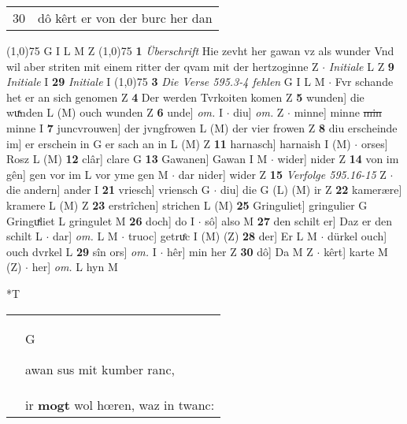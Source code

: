\documentclass[8pt,a4paper,notitlepage]{article}
\begin{document}
\begin{table}[ht]
\begin{minipage}[t]{0.5\linewidth}
\begin{tabular}{rl}
30 & dô kêrt er von der burc her dan\\ 
\end{tabular}
\scriptsize
\line(1,0){75} \newline
G I L M Z \newline
\line(1,0){75} \newline
\textbf{1} \textit{Überschrift} Hie zevht her gawan vz als wunder Vnd wil aber striten mit einem ritter der qvam mit der hertzoginne Z   $\cdot$ \textit{Initiale} L Z  \textbf{9} \textit{Initiale} I  \textbf{29} \textit{Initiale} I  \newline
\line(1,0){75} \newline
\textbf{3} \textit{Die Verse 595.3-4 fehlen} G I L M   $\cdot$ Fvr schande het er an sich genomen Z \textbf{4} Der werden Tvrkoiten komen Z \textbf{5} wunden] die wuͯnden L (M) ouch wunden Z \textbf{6} unde] \textit{om.} I  $\cdot$ diu] \textit{om.} Z  $\cdot$ minne] minne \sout{min} minne I \textbf{7} juncvrouwen] der jvngfrowen L (M) der vier frowen Z \textbf{8} diu erscheinde im] er erschein in G er sach an in L (M) Z \textbf{11} harnasch] harnaish I (M)  $\cdot$ orses] Rosz L (M) \textbf{12} clâr] clare G \textbf{13} Gawanen] Gawan I M  $\cdot$ wider] nider Z \textbf{14} von im gên] gen vor im L vor yme gen M  $\cdot$ dar nider] wider Z \textbf{15} \textit{Verfolge 595.16-15} Z   $\cdot$ die andern] ander I \textbf{21} vriesch] vriensch G  $\cdot$ diu] die G (L) (M) ir Z \textbf{22} kamerære] kramere L (M) Z \textbf{23} erstrîchen] strichen L (M) \textbf{25} Gringuliet] gringulier G Gringuͯliet L gringulet M \textbf{26} doch] do I  $\cdot$ sô] also M \textbf{27} den schilt er] Daz er den schilt L  $\cdot$ dar] \textit{om.} L M  $\cdot$ truoc] getruͤc I (M) (Z) \textbf{28} der] Er L M  $\cdot$ dürkel ouch] ouch dvrkel L \textbf{29} sîn ors] \textit{om.} I  $\cdot$ hêr] min her Z \textbf{30} dô] Da M Z  $\cdot$ kêrt] karte M (Z)  $\cdot$ her] \textit{om.} L hyn M \newline
\end{minipage}
\hspace{0.5cm}
\begin{minipage}[t]{0.5\linewidth}
\small
\begin{center}*T
\end{center}
\begin{tabular}{rl}
 & \begin{large}G\end{large}awan sus mit kumber ranc,\\ 
 & ir \textbf{mogt} wol hœren, waz in twanc:\\ 

\end{tabular}
\end{minipage}
\end{table}
\end{document}
